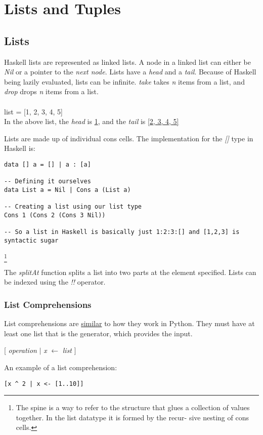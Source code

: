 \section{Lists and Tuples}

\subsection{Lists}
Haskell lists are represented as linked lists.
A node in a linked list can either be \emph{Nil} or a pointer to the \emph{next node}. Lists have a \emph{head} and a \emph{tail}. Because of Haskell being lazily evaluated, lists can be infinite. \emph{take} takes \emph{n} items from a list, and \emph{drop} drops \emph{n} items from a list.\\
\\
list = [1, 2, 3, 4, 5]\\
In the above list, the \emph{head} is \underline{1}, and the \emph{tail} is \underline{[2, 3, 4, 5]}

Lists are made up of individual cons cells. The implementation for the \emph{[]} type in Haskell is:

\begin{lstlisting}
data [] a = [] | a : [a]

-- Defining it ourselves
data List a = Nil | Cons a (List a)

-- Creating a list using our list type
Cons 1 (Cons 2 (Cons 3 Nil))

-- So a list in Haskell is basically just 1:2:3:[] and [1,2,3] is syntactic sugar
\end{lstlisting}

\footnote{The spine is a way to refer to the structure that glues a collection
of values together. In the list datatype it is formed by the recur-
sive nesting of cons cells.}

The \emph{splitAt} function splits a list into two parts at the element specified.
Lists can be indexed using the \emph{!!} operator.

\subsubsection{List Comprehensions}
List comprehensions are \underline{similar} to how they work in Python.
They must have at least one list that is the generator, which provides
the input.

[ \emph{operation} $\vert$ \emph{x} $\leftarrow$ \emph{list} ]

An example of a list comprehension:
\begin{verbatim}
[x ^ 2 | x <- [1..10]]
\end{verbatim}


